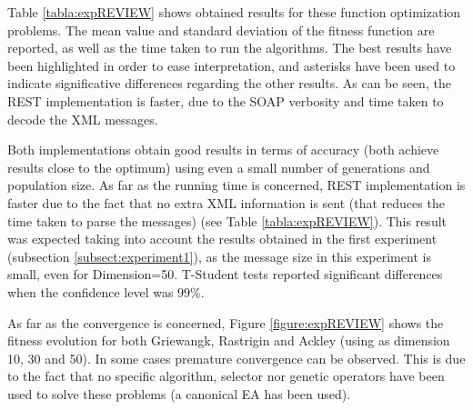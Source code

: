 \documentclass[final,1p,times]{elsarticle}
\begin{document}

Table \ref{tabla:expREVIEW} shows obtained results for these function optimization problems.
The mean value and standard deviation of the fitness function are reported, as well as the time taken to run the algorithms.
The best results have been highlighted in order to ease interpretation, and asterisks have been used to indicate significative differences regarding the other results.
As can be seen, the REST implementation is faster, due to the SOAP verbosity and time taken to decode the XML messages.

Both implementations obtain good results in terms of accuracy (both achieve results close to the optimum) using even a small number of generations and population size. 
As far as the running time is concerned, REST implementation is faster due to the fact that no extra XML information is sent (that reduces the time taken to parse the messages) (see Table \ref{tabla:expREVIEW}). 
This result was expected taking into account the results obtained in the first experiment (subsection \ref{subsect:experiment1}), as the message size in this experiment is small, even for Dimension=50. T-Student tests reported significant differences when the confidence level was $99\%$.


As far as the convergence is concerned, Figure \ref{figure:expREVIEW} shows the fitness evolution for both Griewangk, Rastrigin and Ackley (using as dimension 10, 30 and 50). 
In some cases premature convergence can be observed.
This is due to the fact that no specific algorithm, selector nor genetic operators have been used to solve these problems (a canonical EA has been used).
\end{document}
